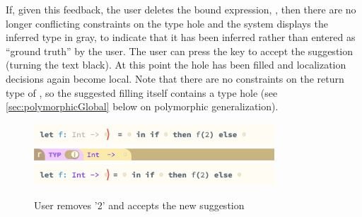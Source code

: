 If, given this feedback, the user deletes the bound expression, , then there are no longer conflicting constraints on the type hole and the system displays the inferred type in gray, to indicate that it has been inferred rather than entered as ``ground truth'' by the user. The user can press the  key to accept the suggestion (turning the text black). At this point the hole has been filled and localization decisions again become local. Note that there are no constraints on the return type of , so the suggested filling itself contains a type hole (see \cref{sec:polymorphicGlobal} below on polymorphic generalization).
\begin{figure}[H]
\includegraphics[width=9cm]{images/example_holes_filled.png}
\includegraphics[width=9cm]{images/example_holes_CI.png}
\includegraphics[width=9cm]{images/example_holes.png}
\caption{User removes '2' and accepts the new suggestion}
\label{fig:editor_ghost}
\end{figure}




